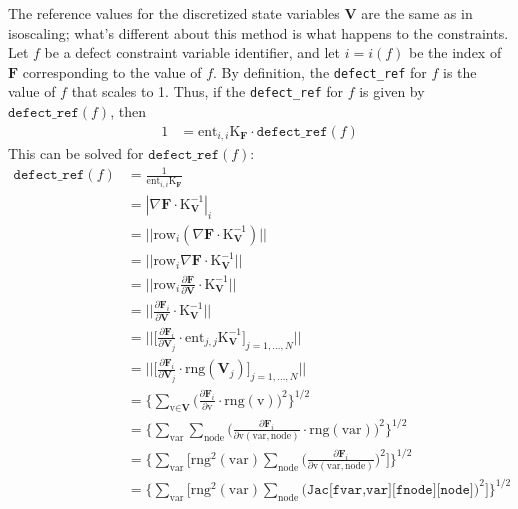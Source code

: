 \documentclass{article}
\theoremstyle{definition}
\begin{document}
\noindent
The reference values for the discretized state variables \textbf{V} are the same as in isoscaling; what's different about this method is what happens to the constraints. \\

\noindent
Let $f$ be a defect constraint variable identifier, and let $i = i(f)$ be the index of $\textbf{F}$ corresponding to the value of $f$. By definition, the \texttt{defect\_ref} for $f$ is the value of $f$ that scales to 1. Thus, if the \texttt{defect\_ref} for $f$ is given by $\texttt{defect\_ref}(f)$, then
\begin{align*}
    1 &= \text{ent}_{i,i} \text{K}_\textbf{F} \cdot \texttt{defect\_ref}(f)
\end{align*}
This can be solved for $\texttt{defect\_ref}(f)$:
\begin{align*}
    \texttt{defect\_ref}(f) &= \frac{1}{\text{ent}_{i,i} \text{K}_\textbf{F}} \\
    &= |\nabla \textbf{F} \cdot \text{K}_\textbf{V}^{-1}|_i \\
    &= ||\text{row}_i(\nabla \textbf{F} \cdot \text{K}_\textbf{V}^{-1})|| \\
    &= ||\text{row}_i \nabla \textbf{F} \cdot \text{K}_\textbf{V}^{-1}|| \\
    &= ||\text{row}_i \frac{\partial \textbf{F}}{\partial \textbf{V}} \cdot \text{K}_\textbf{V}^{-1}|| \\
    &= ||\frac{\partial \textbf{F}_i}{\partial \textbf{V}} \cdot \text{K}_\textbf{V}^{-1}|| \\
    &= ||\Big[ \frac{\partial \textbf{F}_i}{\partial \textbf{V}_j} \cdot \text{ent}_{j,j} \text{K}_\textbf{V}^{-1} \Big]_{j=1,\dots,N}|| \\
    &= ||\Big[ \frac{\partial \textbf{F}_i}{\partial \textbf{V}_j} \cdot \text{rng}(\textbf{V}_j) \Big]_{j=1,\dots,N}|| \\
    &= \Big\{ \sum_{\text{v} \in \textbf{V}} \Big( \frac{\partial \textbf{F}_i}{\partial \text{v}} \cdot \text{rng}(\text{v}) \Big)^2 \Big\}^{1/2} \\
    &= \Big\{ \sum_{\text{var}}\sum_{\text{node}} \Big( \frac{\partial \textbf{F}_i}{\partial \text{v}(\text{var},\text{node})} \cdot \text{rng}(\text{var}) \Big)^2 \Big\}^{1/2} \\
    &= \Big\{ \sum_{\text{var}} \Big[ \text{rng}^2(\text{var}) \sum_{\text{node}} \Big( \frac{\partial \textbf{F}_i}{\partial \text{v}(\text{var},\text{node})} \Big)^2 \Big] \Big\}^{1/2} \\
    &= \Big\{ \sum_{\text{var}} \Big[ \text{rng}^2(\text{var}) \sum_{\text{node}} \Big( \texttt{Jac[fvar,var][fnode][node]} \Big)^2 \Big] \Big\}^{1/2}
\end{align*}
\end{document}

